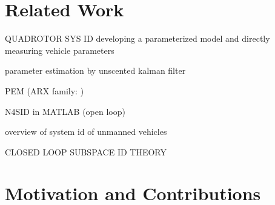 \section{Related Work}

QUADROTOR SYS ID
developing a parameterized model and directly measuring vehicle parameters \cite{pounds2006modelling, kivrak2006design, bresciani2008modelling, domingues2009quadrotor, schreier2012modeling}


parameter estimation  by unscented kalman filter \cite{abas2011parameter}

PEM (ARX family: \cite{chamberlain2011system})

N4SID in MATLAB (open loop) \cite{batmazdesign}

overview of system id of unmanned vehicles \cite{ingebretsen2012system}


CLOSED LOOP SUBSPACE ID THEORY



\section{Motivation and Contributions}



